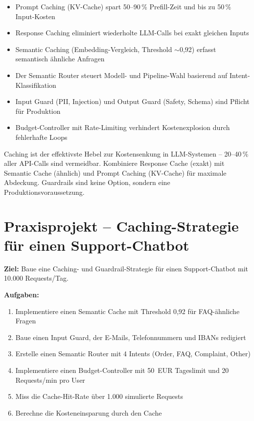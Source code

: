 \begin{zusammenfassungEnv}
\begin{itemize}[leftmargin=*]
    \item Prompt Caching (KV-Cache) spart 50--90\,\% Prefill-Zeit und bis zu 50\,\% Input-Kosten
    \item Response Caching eliminiert wiederholte LLM-Calls bei exakt gleichen Inputs
    \item Semantic Caching (Embedding-Vergleich, Threshold $\sim$0,92) erfasst semantisch ähnliche Anfragen
    \item Der Semantic Router steuert Modell- und Pipeline-Wahl basierend auf Intent-Klassifikation
    \item Input Guard (PII, Injection) und Output Guard (Safety, Schema) sind Pflicht für Produktion
    \item Budget-Controller mit Rate-Limiting verhindert Kostenexplosion durch fehlerhafte Loops
\end{itemize}
\end{zusammenfassungEnv}




\par\mbox{}\par
\begin{merkeEnv}
Caching ist der effektivste Hebel zur Kostensenkung in LLM-Systemen -- 20--40\,\% aller API-Calls sind vermeidbar. Kombiniere Response Cache (exakt) mit Semantic Cache (ähnlich) und Prompt Caching (KV-Cache) für maximale Abdeckung. Guardrails sind keine Option, sondern eine Produktionsvoraussetzung.
\end{merkeEnv}

\section{Praxisprojekt -- Caching-Strategie für einen Support-Chatbot}

\textbf{Ziel:} Baue eine Caching- und Guardrail-Strategie für einen Support-Chatbot mit 10.000 Requests/Tag.

\textbf{Aufgaben:}
\begin{enumerate}[leftmargin=*]
    \item Implementiere einen Semantic Cache mit Threshold 0,92 für FAQ-ähnliche Fragen
    \item Baue einen Input Guard, der E-Mails, Telefonnummern und IBANs redigiert
    \item Erstelle einen Semantic Router mit 4 Intents (Order, FAQ, Complaint, Other)
    \item Implementiere einen Budget-Controller mit 50~EUR Tageslimit und 20 Requests/min pro User
    \item Miss die Cache-Hit-Rate über 1.000 simulierte Requests
    \item Berechne die Kosteneinsparung durch den Cache
\end{enumerate}


